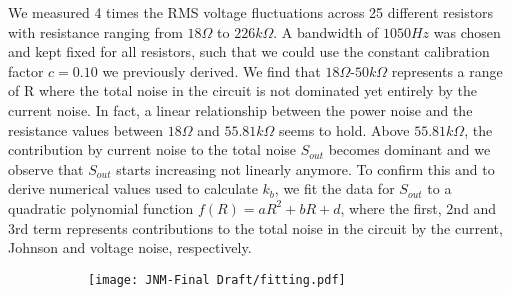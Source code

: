 \begin{linenumbers}
We measured 4 times the RMS voltage fluctuations across 25 different resistors with resistance ranging from $18\Omega$ to $226 k\Omega$. A bandwidth of $1050Hz$ was chosen and kept fixed for all resistors, such that we could use the constant calibration factor $c=0.10$ we previously derived.
We find that $18 \Omega$-$50k\Omega$ represents a range of R where the total noise in the circuit is not dominated yet entirely by the current noise. In fact, a linear relationship between the power noise and the resistance values between $18 \Omega$ and $55.81 k\Omega$ seems to hold. Above $55.81k\Omega$, the contribution by current noise to the total noise $S_{out}$ becomes dominant and we observe that $S_{out}$ starts increasing not linearly anymore. To confirm this and to derive numerical values used to calculate $k_b$, we fit the data for $S_{out}$ to a quadratic polynomial function $f(R)=aR^2+bR+d$, where the first, 2nd and 3rd term represents contributions to the total noise in the circuit by the current, Johnson and voltage noise, respectively. 
\begin{figure}[h]
\centering
\begin{subfigure}{0.5\textwidth}
    \texttt{[image: JNM-Final Draft/fitting.pdf]}
    \label{fig:first} 
\end{subfigure}


\end{figure}
\end{linenumbers}
